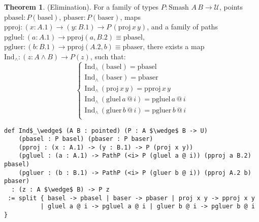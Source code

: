 \documentclass{article}
\theoremstyle{definition}
\newtheorem{theorem}{Theorem}
\begin{document}
\begin{theorem} (Elimination).
For a family of types \( P : \text{Smash } A \, B \to \mathcal{U} \),
points \( \text{pbasel} : P(\text{basel}) \),
         \( \text{pbaser} : P(\text{baser}) \), maps
\( \text{pproj} : (x : A.1) \to (y : B.1) \to P \, (\text{proj} \, x \, y) \),
and a family of paths
\( \text{pgluel} : (a : A.1) \to \text{pproj}(a,B.2) \equiv \text{pbasel} \),
\( \text{pgluer} : (b : B.1) \to \text{pproj}(A.2,b) \equiv \text{pbaser} \),
there exists a map \( \text{Ind}_\wedge : (z : A \wedge B) \to P(z) \), such that:
\[
\begin{cases}
\text{Ind}_\wedge \, (\text{basel}) = \text{pbasel} \\
\text{Ind}_\wedge \, (\text{baser}) = \text{pbaser} \\
\text{Ind}_\wedge \, (\text{proj} \, x \, y) = \text{pproj} \, x \, y \\
\text{Ind}_\wedge \, (\text{gluel} \, a \, @ \, i) = \text{pgluel} \, a \, @ \, i \\
\text{Ind}_\wedge \, (\text{gluer} \, b \, @ \, i) = \text{pgluer} \, b \, @ \, i \\
\end{cases}
\]
\begin{lstlisting}[mathescape=true]
def Ind$_\wedge$ (A B : pointed) (P : A $\wedge$ B -> U)
    (pbasel : P basel) (pbaser : P baser)
    (pproj : (x : A.1) -> (y : B.1) -> P (proj x y))
    (pgluel : (a : A.1) -> PathP (<i> P (gluel a @ i)) (pproj a B.2) pbasel)
    (pgluer : (b : B.1) -> PathP (<i> P (gluer b @ i)) (pproj A.2 b) pbaser)
  : (z : A $\wedge$ B) -> P z
 := split { basel -> pbasel | baser -> pbaser | proj x y -> pproj x y
          | gluel a @ i -> pgluel a @ i | gluer b @ i -> pgluer b @ i }
\end{lstlisting}
\end{theorem}
\end{document}
